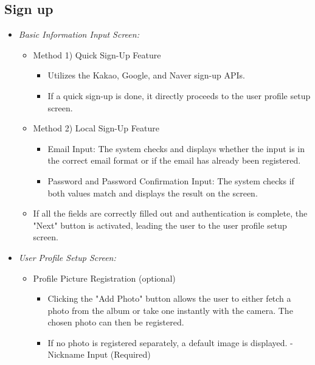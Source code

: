 \documentclass[conference]{IEEEtran}
\begin{document}
\subsection{Sign up}
\begin{itemize}
\item{\emph{Basic Information Input Screen:}}
    \begin{itemize}
        \item Method 1) Quick Sign-Up Feature
        \begin{itemize}
            \item Utilizes the Kakao, Google, and Naver sign-up APIs.
            \item If a quick sign-up is done, it directly proceeds to the user profile setup screen.
        \end{itemize}
        \item Method 2) Local Sign-Up Feature
        \begin{itemize}
            \item Email Input: The system checks and displays whether the input is in the correct email format or if the email has already been registered.
            \item Password and Password Confirmation Input: The system checks if both values match and displays the result on the screen.
        \end{itemize}
        \item If all the fields are correctly filled out and authentication is complete, the "Next" button is activated, leading the user to the user profile setup screen. \newline 
    \end{itemize}
\item{\emph{User Profile Setup Screen:}}
    \begin{itemize}
        \item Profile Picture Registration (optional)
            \begin{itemize}
            \item Clicking the "Add Photo" button allows the user to either fetch a photo from the album or take one instantly with the camera. The chosen photo can then be registered.
            \item If no photo is registered separately, a default image is displayed. - Nickname Input (Required)

\end{itemize}
\end{itemize}
\end{itemize}
\end{document}
